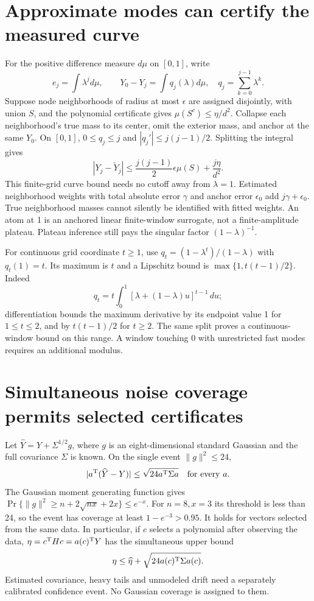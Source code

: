 \section{Approximate modes can certify the measured curve}\label{sec:curve-certificate}
For the positive difference measure $d\mu$ on $[0,1]$, write
\[
 e_j=\int\lambda^j d\mu,\qquad
 Y_0-Y_j=\int q_j(\lambda)d\mu,\quad
 q_j=\sum_{k=0}^{j-1}\lambda^k.
\]
Suppose node neighborhoods of radius at most $\epsilon$ are assigned
disjointly, with union $S$, and the polynomial certificate gives
$\mu(S^c)\le\eta/d^2$. Collapse each neighborhood's true mass to its
center, omit the exterior mass, and anchor at the same $Y_0$. On $[0,1]$,
$0\le q_j\le j$ and $|q_j'|\le j(j-1)/2$. Splitting the integral gives
\[
 |Y_j-\widetilde Y_j|\le
 \frac{j(j-1)}2\epsilon\mu(S)+\frac{j\eta}{d^2}.
\]
This finite-grid curve bound needs no cutoff away from $\lambda=1$.
Estimated neighborhood weights with total absolute error $\gamma$ and
anchor error $\epsilon_0$ add $j\gamma+\epsilon_0$. True neighborhood
masses cannot silently be identified with fitted weights. An atom at 1 is
an anchored linear finite-window surrogate, not a finite-amplitude plateau.
Plateau inference still pays the singular factor $(1-\lambda)^{-1}$.

For continuous grid coordinate $t\ge 1$, use
$q_t=(1-\lambda^t)/(1-\lambda)$ with $q_t(1)=t$.
Its maximum is $t$ and a Lipschitz bound is
$\max\{1,t(t-1)/2\}$. Indeed
\[
 q_t=t\int_0^1[\lambda+(1-\lambda)u]^{t-1}\,du;
\]
differentiation bounds the maximum derivative by its endpoint value 1
for $1\le t\le 2$, and by $t(t-1)/2$ for $t\ge 2$.
The same split proves a continuous-window bound on this range. A window
touching 0 with unrestricted fast modes requires an additional modulus.

\section{Simultaneous noise coverage permits selected certificates}
Let $\widehat Y=Y+\Sigma^{1/2}g$, where $g$ is an eight-dimensional
standard Gaussian and the full covariance $\Sigma$ is known. On the
single event $\|g\|^2\le 24$,
\[
 |a^{\rm T}(\widehat Y-Y)|\le\sqrt{24a^{\rm T}\Sigma a}
 \quad\hbox{for every }a.
\]
The Gaussian moment generating function gives
$\Pr\{\|g\|^2\ge n+2\sqrt{nx}+2x\}\le e^{-x}$.
For $n=8,x=3$ its threshold is less than 24, so the event has coverage
at least $1-e^{-3}>0.95$. It holds for vectors selected from the same data.
In particular, if $c$ selects a polynomial after observing the data,
$\eta=c^{\rm T}Hc=a(c)^{\rm T}Y$ has the simultaneous upper bound
\[
 \eta\le\widehat\eta+\sqrt{24a(c)^{\rm T}\Sigma a(c)}.
\]
Estimated covariance, heavy tails and unmodeled drift need a separately
calibrated confidence event. No Gaussian coverage is assigned to them.

